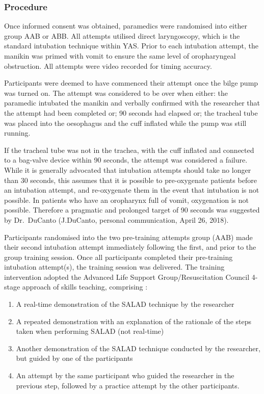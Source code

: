 \documentclass[]{article}
\providecommand{\tightlist}{%
  \setlength{\itemsep}{0pt}\setlength{\parskip}{0pt}}
\begin{document}
\hypertarget{procedure}{%
\subsubsection{Procedure}\label{procedure}}

Once informed consent was obtained, paramedics were randomised into
either group AAB or ABB. All attempts utilised direct laryngoscopy,
which is the standard intubation technique within YAS. Prior to each
intubation attempt, the manikin was primed with vomit to ensure the same
level of oropharyngeal obstruction. All attempts were video recorded for
timing accuracy.

Participants were deemed to have commenced their attempt once the bilge
pump was turned on. The attempt was considered to be over when either:
the paramedic intubated the manikin and verbally confirmed with the
researcher that the attempt had been completed or; 90 seconds had
elapsed or; the tracheal tube was placed into the oesophagus and the
cuff inflated while the pump was still running.

If the tracheal tube was not in the trachea, with the cuff inflated and
connected to a bag-valve device within 90 seconds, the attempt was
considered a failure. While it is generally advocated that intubation
attempts should take no longer than 30 seconds, this assumes that it is
possible to pre-oxygenate patients before an intubation attempt, and
re-oxygenate them in the event that intubation is not possible. In
patients who have an oropharynx full of vomit, oxygenation is not
possible. Therefore a pragmatic and prolonged target of 90 seconds was
suggested by Dr.~DuCanto (J.DuCanto, personal communication, April 26,
2018).

Participants randomised into the two pre-training attempts group (AAB)
made their second intubation attempt immediately following the first,
and prior to the group training session. Once all participants completed
their pre-training intubation attempt(s), the training session was
delivered. The training intervention adopted the Advanced Life Support
Group/Resuscitation Council 4-stage approach of skills teaching,
comprising \citep{bullock_pocket_2008}:

\begin{enumerate}
\def\labelenumi{\arabic{enumi}.}
\tightlist
\item
  A real-time demonstration of the SALAD technique by the researcher
\item
  A repeated demonstration with an explanation of the rationale of the
  steps taken when performing SALAD (not real-time)
\item
  Another demonstration of the SALAD technique conducted by the
  researcher, but guided by one of the participants
\item
  An attempt by the same participant who guided the researcher in the
  previous step, followed by a practice attempt by the other
  participants.
\end{enumerate}
\end{document}
